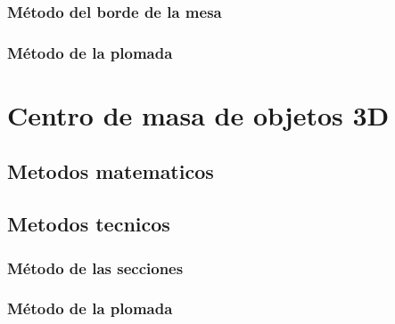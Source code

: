 \documentclass[
  16pt,
]{krantz}
\theoremstyle{definition}
\theoremstyle{definition}
\theoremstyle{definition}
\theoremstyle{definition}
\theoremstyle{remark}
\begin{document}
\hypertarget{muxe9todo-del-borde-de-la-mesa}{%
\subsubsection{Método del borde de la mesa}\label{muxe9todo-del-borde-de-la-mesa}}

\hypertarget{muxe9todo-de-la-plomada}{%
\subsubsection{Método de la plomada}\label{muxe9todo-de-la-plomada}}

\hypertarget{centro-de-masa-de-objetos-3d}{%
\section{Centro de masa de objetos 3D}\label{centro-de-masa-de-objetos-3d}}

\hypertarget{metodos-matematicos-1}{%
\subsection{Metodos matematicos}\label{metodos-matematicos-1}}

\hypertarget{metodos-tecnicos-1}{%
\subsection{Metodos tecnicos}\label{metodos-tecnicos-1}}

\hypertarget{muxe9todo-de-las-secciones}{%
\subsubsection{Método de las secciones}\label{muxe9todo-de-las-secciones}}

\hypertarget{muxe9todo-de-la-plomada-1}{%
\subsubsection{Método de la plomada}\label{muxe9todo-de-la-plomada-1}}

  

\printindex
\end{document}
